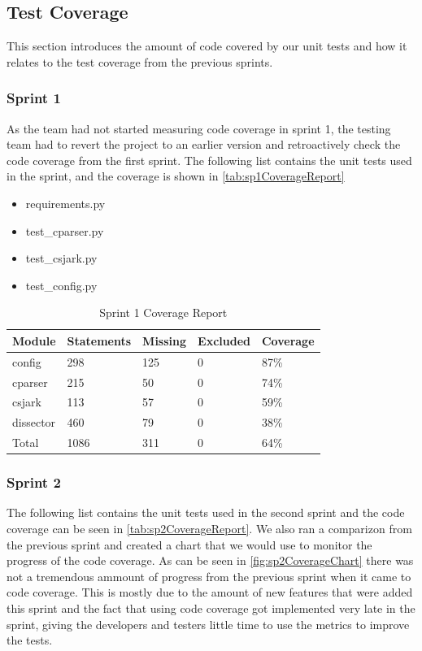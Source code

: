 \subsection{Test Coverage}
This section introduces the amount of code covered by our unit tests and how it relates to the test coverage from the previous sprints.

\subsubsection{Sprint 1}
As the team had not started measuring code coverage in sprint 1, the testing team had to revert the project to an earlier version and retroactively check the code coverage from the first sprint. The following list contains the unit tests used in the sprint, and the coverage is shown in \autoref{tab:sp1CoverageReport}

\begin {itemize}
\item requirements.py
\item test\_cparser.py
\item test\_csjark.py
\item test\_config.py
\end{itemize}

\begin{table}[!htb]\footnotesize\center
	\caption{Sprint 1 Coverage Report\label{tab:sp1CoverageReport}}
	\begin{tabular}{l l l l l}
		\toprule
		Module & Statements & Missing & Excluded & Coverage\\
		\midrule
		config & 298 & 125 & 0 & 87\%\ \\
		cparser & 215 & 50 & 0 & 74\%\ \\
		csjark & 113 & 57 & 0 & 59\%\ \\
		\gls{dissector} & 460 & 79 & 0 & 38\%\ \\
		Total & 1086 & 311 & 0 & 64\%\ \\
		\bottomrule
	\end{tabular}
\end{table}

\subsubsection{Sprint 2}
The following list contains the unit tests used in the second sprint and the code coverage can be seen in \autoref{tab:sp2CoverageReport}. We also ran a comparizon from the previous sprint and created a chart that we would use to monitor the progress of the code coverage. As can be seen in \autoref{fig:sp2CoverageChart} there was not a tremendous ammount of progress from the previous sprint when it came to code coverage. This is mostly due to the amount of new features that were added this sprint and the fact that using code coverage got implemented very late in the sprint, giving the developers and testers little time to use the metrics to improve the tests.

